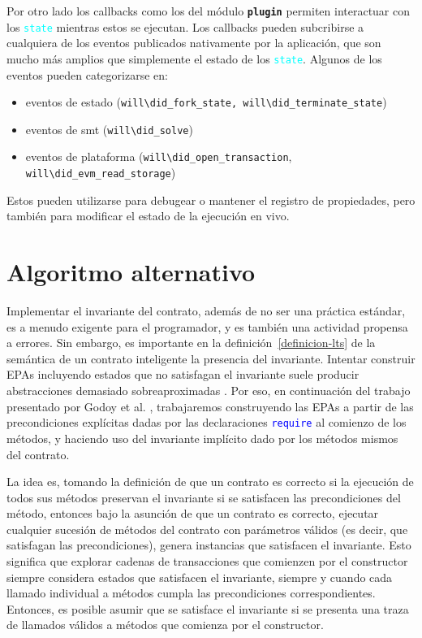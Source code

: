 Por otro lado los callbacks como los del módulo
\texttt{\textbf{plugin}} permiten interactuar con los \textcolor{cyan}{\texttt{state}} mientras estos se ejecutan.
Los callbacks pueden subcribirse a cualquiera de los eventos publicados nativamente por la aplicación, que son mucho más amplios que simplemente el estado de los \textcolor{cyan}{\texttt{state}}.
Algunos de los eventos pueden categorizarse en:
\begin{itemize}
    \item eventos de estado (\texttt{will\textbackslash did\_fork\_state, will\textbackslash did\_terminate\_state})
    \item eventos de smt (\texttt{will\textbackslash did\_solve})
    \item eventos de plataforma (\texttt{will\textbackslash did\_open\_transaction},\\ \texttt{will\textbackslash did\_evm\_read\_storage})
\end{itemize}
Estos pueden utilizarse para debugear o mantener el registro de propiedades, pero también para modificar el estado de la ejecución en vivo.



\section{Algoritmo alternativo}

Implementar el invariante del contrato, además de no ser una práctica estándar, es a menudo exigente para el programador, y es también una actividad propensa a errores.
Sin embargo, es importante en la definición~\ref{definicion-lts} de la semántica de un contrato inteligente la  presencia del invariante.
Intentar construir EPAs incluyendo estados que no satisfagan el invariante suele producir abstracciones demasiado sobreaproximadas \cite{de-caso-epa}.
Por eso, en continuación del trabajo presentado por Godoy et al. \cite{predicate-abstraction-for-smart-contract-validation}, trabajaremos construyendo las EPAs a partir de las precondiciones explícitas dadas por las declaraciones \textcolor{blue}{\texttt{require}} al comienzo de los métodos, y haciendo uso  del invariante implícito dado por los métodos mismos del contrato.

La idea es, tomando la definición de que un contrato es correcto si la ejecución de todos sus métodos preservan el invariante si se satisfacen las precondiciones del método, entonces bajo la asunción de que un contrato es correcto, ejecutar cualquier sucesión de métodos del contrato con parámetros válidos (es decir, que satisfagan las precondiciones), genera instancias que satisfacen el invariante.
Esto significa que explorar cadenas de transacciones que comienzen por el constructor siempre considera estados que satisfacen el invariante, siempre y cuando cada llamado individual a métodos cumpla las precondiciones correspondientes.
Entonces, es posible asumir que se satisface el invariante si se presenta una traza de llamados válidos a métodos que comienza por el constructor.

